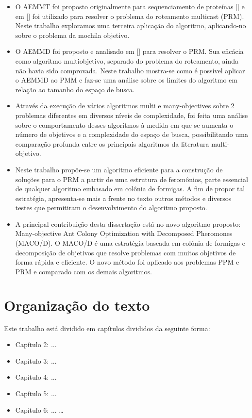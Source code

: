 \begin{itemize}  
	\item O AEMMT foi proposto originalmente para sequenciamento de proteínas [] e em [] foi utilizado para resolver o problema do roteamento multicast (PRM). Neste trabalho exploramos uma terceira aplicação do algoritmo, aplicando-no sobre o problema da mochila objetivo.
	\item O AEMMD foi proposto e analisado em [] para resolver o PRM. Sua eficácia como algoritmo multiobjetivo, separado do problema do roteamento, ainda não havia sido comprovada. Neste trabalho mostra-se como é possível aplicar o AEMMD ao PMM e faz-se uma análise sobre os limites do algoritmo em relação ao tamanho do espaço de busca.
	\item Através da execução de vários algoritmos multi e many-objectives sobre 2 problemas diferentes em diversos níveis de complexidade, foi feita uma análise sobre o comportamento desses algoritmos à medida em que se aumenta o número de objetivos e a complexidade do espaço de busca, possibilitando uma comparação profunda entre os principais algoritmos da literatura multi-objetivo.
	\item Neste trabalho propõe-se um algoritmo eficiente para a construção de soluções para o PRM a partir de uma estrutura de feromônios, parte essencial de qualquer algoritmo embasado em colônia de formigas. A fim de propor tal estratégia, apresenta-se mais a frente no texto outros métodos e diversos testes que permitiram o desenvolvimento do algoritmo proposto. 
	\item A principal contribuição desta dissertação está no novo algoritmo proposto: Many-objective Ant Colony Optimization with Decomposed Pheromones (MACO/D). O MACO/D é uma estratégia baseada em colônia de formigas e decomposição de objetivos que resolve problemas com muitos objetivos de forma rápida e eficiente. O novo método foi aplicado aos problemas PPM e PRM e comparado com os demais algoritmos.
\end{itemize}

\section{Organização do texto}
Este trabalho está dividido em capítulos divididos da seguinte forma:

\begin{itemize}  
	\item Capítulo 2: ...
	\item Capítulo 3: ...
	\item Capítulo 4: ...
	\item Capítulo 5: ...
	\item Capítulo 6: ... \ldots
\end{itemize}